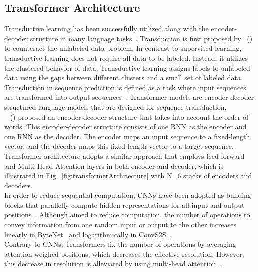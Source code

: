 \subsection{Transformer Architecture}
\label{subsec:newsContentModels_TransformerArch}
Transductive learning has been successfully utilized along with the encoder-decoder structure in many language
tasks~\parencite{S2SLearningWithNNs_Sutskever, LearningPhraseRepresentations_Cho, AttentionIsAllYouNeed_Vaswani}. Transduction is first proposed by~\citeauthor{LearningByTransduction_Gammerman} (\citeyear{LearningByTransduction_Gammerman}) to counteract the unlabeled data problem. In contrast to supervised learning, transductive learning does not require all data to be labeled. Instead, it utilizes the clustered behavior of data. Transductive learning assigns labels to unlabeled data using the gaps between different clusters and a small set of labeled data. Transduction in sequence prediction is defined as a task where input sequences are transformed into output sequences~\parencite{SequenceTransdutionWithRNNs_Graves}. Transformer models are encoder-decoder structured language models that are designed for sequence transduction.\\
~\citeauthor{LearningPhraseRepresentations_Cho} (\citeyear{LearningPhraseRepresentations_Cho}) proposed an encoder-decoder structure that takes into account the order of words. This encoder-decoder structure consists of one RNN as the encoder and one RNN as the decoder. The encoder maps an input sequence to a fixed-length vector, and the decoder maps this fixed-length vector to a target sequence. Transformer architecture adopts a similar approach that employs feed-forward and Multi-Head Attention layers in both encoder and decoder, which is illustrated in Fig.~\ref{fig:transformerArchitecture} with N=6 stacks of encoders and decoders.\\
In order to reduce sequential computation, CNNs have been adopted as building blocks that parallelly compute hidden representations for all input and output positions~\parencite{AttentionIsAllYouNeed_Vaswani}. Although aimed to reduce computation, the number of operations to convey information from one random input or output to  the other increases linearly in ByteNet~\parencite{ByteNet_Kalchbrenner} and logarithmically in ConvS2S~\parencite{ConvS2S_Gehring}.\\
Contrary to CNNs, Transformers fix the number of operations by averaging attention-weighed positions, which decreases the effective resolution. However, this decrease in resolution is alleviated by using multi-head attention~\parencite{AttentionIsAllYouNeed_Vaswani}.
